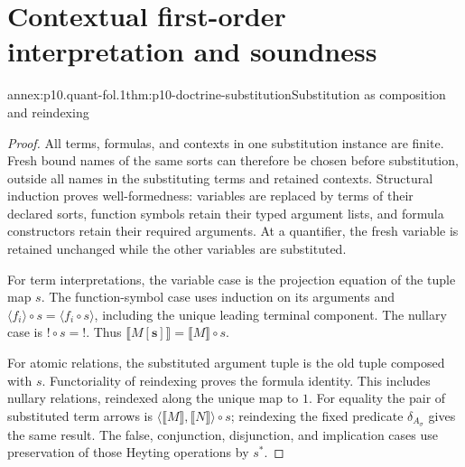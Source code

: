 
\section{Contextual first-order interpretation and soundness}

\begin{annexitem}{annex:p10.quant-fol.1}{thm:p10-doctrine-substitution}{Substitution as composition and reindexing}
\begin{proof}
All terms, formulas, and contexts in one substitution instance are finite.
Fresh bound names of the same sorts can therefore be chosen before
substitution, outside all names in the substituting terms and retained
contexts. Structural induction proves well-formedness: variables are
replaced by terms of their declared sorts, function symbols retain
their typed argument lists, and formula constructors retain their
required arguments. At a quantifier, the fresh variable is retained
unchanged while the other variables are substituted.

For term interpretations, the variable case is the projection equation
of the tuple map \(s\). The function-symbol case uses induction on
its arguments and
\(\langle f_i\rangle\circ s=\langle f_i\circ s\rangle\), including
the unique leading terminal component.
The nullary case is \(!\circ s=!\).
Thus \(\llbracket M[\mathbf s]\rrbracket=\llbracket M\rrbracket\circ s\).

For atomic relations, the substituted argument tuple is the old tuple
composed with \(s\). Functoriality of reindexing proves the formula
identity. This includes nullary relations, reindexed along the unique
map to \(1\).
For equality the pair of substituted term arrows is
\(\langle\llbracket M\rrbracket,\llbracket N\rrbracket\rangle\circ s\);
reindexing the fixed predicate \(\delta_{A_\sigma}\) gives the same result.
The false, conjunction, disjunction, and implication cases use
preservation of those Heyting operations by \(s^*\).


\end{proof}
\end{annexitem}
